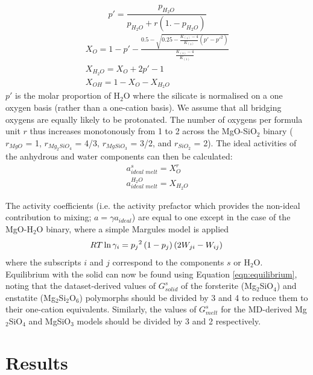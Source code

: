 \documentclass[review]{elsarticle}
\begin{document}
\begin{equation}
p' = \frac{p_{H_2O}}{p_{H_2O}  + r \left(1.-p_{H_2O} \right)} 
\end{equation}
\begin{eqnarray}
X_O = 1 - p' - \frac{ 0.5 - \sqrt{ 0.25 - \frac{K_{(1)}-4}{K_{(1)}} \left(p'-p'^2 \right)}}{\frac{K_{(1)}-4}{K_{(1)}} }\\
X_{H_2O} = X_O + 2 p' - 1 \\
X_{OH} = 1 - X_O - X_{H_2O}
\end{eqnarray}
\noindent $p'$ is the molar proportion of H$_2$O where the silicate is normalised on a one oxygen basis (rather than a one-cation basis). We assume that all bridging oxygens are equally likely to be protonated. The number of oxygens per formula unit $r$ thus increases monotonously from 1 to 2 across the MgO-SiO$_2$ binary ($r_{MgO}$ = 1, $r_{Mg_2SiO_4}$ = 4/3, $r_{MgSiO_3}$ = 3/2, and $r_{SiO_2}$ = 2). The ideal activities of the anhydrous and water components can then be calculated:
\begin{eqnarray}
a^{\textit{s}}_{\textit{ideal melt}} =X_O^r \\
a^{H_2O}_{\textit{ideal melt}} = X_{H_2O}
\end{eqnarray}

The activity coefficients (i.e. the activity prefactor which provides the non-ideal contribution to mixing; $a = \gamma a_{ideal}$) are equal to one except in the case of the MgO-H$_2$O binary, where a simple Margules model is applied \citep{HM2012}
\begin{equation}
RT \ln \gamma_i = {p_j}^2 \left( 1 - p_j \right) \left( 2 W_{ji} - W_{ij} \right) \\
\end{equation}
\noindent where the subscripts $i$ and $j$ correspond to the components $s$ or H$_2$O. Equilibrium with the solid can now be found using Equation \ref{eqn:equilibrium}, noting that the dataset-derived values of $G^s_{solid}$ of the forsterite (Mg$_2$SiO$_4$) and enstatite (Mg$_2$Si$_2$O$_6$) polymorphs \citep{SLB2011} should be divided by 3 and 4 to reduce them to their one-cation equivalents. Similarly, the values of $G^s_{melt}$ for the MD-derived Mg$_2$SiO$_4$ and MgSiO$_3$ models \citep{DKS2013} should be divided by 3 and 2 respectively.


\clearpage
\section{Results}
\end{document}
